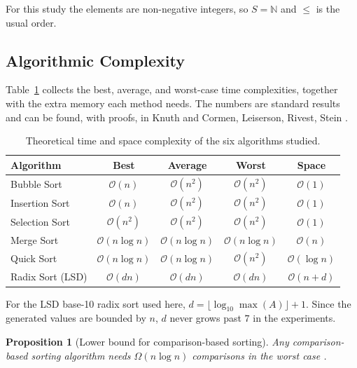 \documentclass[11pt,a4paper]{article}
\newtheorem{proposition}{Proposition}
\begin{document}
For this study the elements are non-negative integers, so $S = \mathbb{N}$ and $\leq$ is the usual order.

\subsection{Algorithmic Complexity}

Table~\ref{tab:complexity} collects the best, average, and worst-case time complexities, together with the extra memory each method needs. The numbers are standard results and can be found, with proofs, in Knuth \cite{knuth1998} and Cormen, Leiserson, Rivest, Stein \cite{cormen2022}.

\begin{table}[H]
\centering
\caption{Theoretical time and space complexity of the six algorithms studied.}
\label{tab:complexity}
\begin{tabular}{lcccc}
\toprule
\textbf{Algorithm} & \textbf{Best} & \textbf{Average} & \textbf{Worst} & \textbf{Space} \\
\midrule
Bubble Sort      & $\mathcal{O}(n)$        & $\mathcal{O}(n^2)$      & $\mathcal{O}(n^2)$      & $\mathcal{O}(1)$ \\
Insertion Sort   & $\mathcal{O}(n)$        & $\mathcal{O}(n^2)$      & $\mathcal{O}(n^2)$      & $\mathcal{O}(1)$ \\
Selection Sort   & $\mathcal{O}(n^2)$      & $\mathcal{O}(n^2)$      & $\mathcal{O}(n^2)$      & $\mathcal{O}(1)$ \\
Merge Sort       & $\mathcal{O}(n \log n)$ & $\mathcal{O}(n \log n)$ & $\mathcal{O}(n \log n)$ & $\mathcal{O}(n)$ \\
Quick Sort       & $\mathcal{O}(n \log n)$ & $\mathcal{O}(n \log n)$ & $\mathcal{O}(n^2)$      & $\mathcal{O}(\log n)$ \\
Radix Sort (LSD) & $\mathcal{O}(dn)$       & $\mathcal{O}(dn)$       & $\mathcal{O}(dn)$       & $\mathcal{O}(n + d)$ \\
\bottomrule
\end{tabular}
\end{table}

For the LSD base-10 radix sort used here, $d = \lfloor \log_{10} \max(A) \rfloor + 1$. Since the generated values are bounded by $n$, $d$ never grows past $7$ in the experiments.

\begin{proposition}[Lower bound for comparison-based sorting]
Any comparison-based sorting algorithm needs $\Omega(n \log n)$ comparisons in the worst case \cite{cormen2022}.
\end{proposition}
\end{document}
